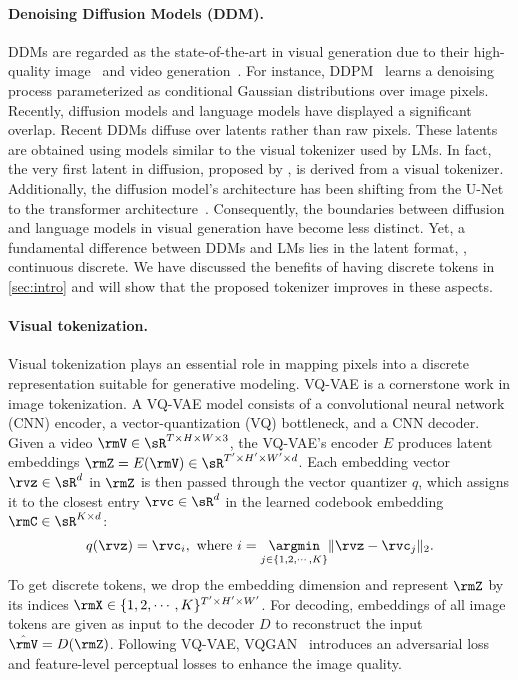\vspace{-4mm}
\paragraph{Denoising Diffusion Models (DDM).}
DDMs \citep{sohl2015deep,song2019generative} are regarded as the state-of-the-art in visual generation due to their high-quality image~\citep{dhariwal2021diffusion,ho2022imagen} and video generation~\citep{ho2022video}. For instance, DDPM~\citep{ho2020denoising} learns a denoising process parameterized as conditional Gaussian distributions over image pixels. Recently, diffusion models and language models have displayed a significant overlap. Recent DDMs diffuse over latents rather than raw pixels. These latents are obtained using models similar to the visual tokenizer used by LMs. In fact, the very first latent in diffusion, proposed by \citet{rombach2022high}, is derived from a visual tokenizer. Additionally, the diffusion model's architecture has been shifting from the U-Net to the transformer architecture~\citep{peebles2022scalable}. Consequently, the boundaries between diffusion and language models in visual generation have become less distinct. 
Yet, a fundamental difference between DDMs and LMs lies in the latent format, \ie, continuous \vs discrete. We have discussed the benefits of having discrete tokens in \cref{sec:intro} and 
will show that the proposed tokenizer improves in these aspects.

\vspace{-4mm}
\paragraph{Visual tokenization.}
Visual tokenization plays an essential role in mapping pixels into a discrete representation suitable for generative modeling. VQ-VAE \citep{van2017neural} is a cornerstone work in image tokenization. A VQ-VAE model consists of a convolutional neural network (CNN) encoder, a vector-quantization (VQ) bottleneck, and a CNN decoder.
Given a video $\rmV \in \sR^{T \times H \times W \times 3}$, the VQ-VAE's encoder $E$ produces latent embeddings $\rmZ = E(\rmV) \in \sR^{T'\times H'\times W'\times d}$. 
Each embedding vector $\rvz \in \sR^d$ in $\rmZ$ is then passed through the vector quantizer $q$, which assigns it to the closest entry $\rvc \in \sR^d$ in the learned codebook embedding $\rmC \in \sR^{K \times d}$:
\begin{equation}
\vspace{-2mm}
    q(\rvz) = \rvc_i, \text{ where } i=\underset{j \in \{1,2,\cdots,K\}}{\argmin}\Vert \rvz - \rvc_j \Vert_2.
\end{equation}
To get discrete tokens, we drop the embedding dimension and represent $\rmZ$ by its indices $\rmX \in \{1, 2, \cdots, K\}^{T' \times H' \times W'}$. For decoding, embeddings of all image tokens are given as input to the decoder $D$ to reconstruct the input $\hat{\rmV} = D(\rmZ)$. 
Following VQ-VAE, VQGAN~\citep{esser2021taming} introduces an adversarial loss and feature-level perceptual losses to enhance the image quality.

